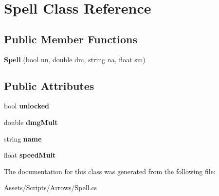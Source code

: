\hypertarget{class_spell}{}\section{Spell Class Reference}
\label{class_spell}
\subsection*{Public Member Functions}
\begin{DoxyCompactItemize}
\item 
\mbox{\label{class_spell_a69429a1783933ad446ee57e9a35b10de}} 
{\bfseries Spell} (bool un, double dm, string na, float sm)
\end{DoxyCompactItemize}
\subsection*{Public Attributes}
\begin{DoxyCompactItemize}
\item 
\mbox{\label{class_spell_aafd49e25b1309ecfc23b56e1aaabfd19}} 
bool {\bfseries unlocked}
\item 
\mbox{\label{class_spell_a79d53f2fffa4b3ad9e4adb166430a9fc}} 
double {\bfseries dmg\+Mult}
\item 
\mbox{\label{class_spell_ae6a6af372417cf9f204db6ea1cb18de6}} 
string {\bfseries name}
\item 
\mbox{\label{class_spell_ab0a70c8037e539a887c0447d5f5d72e2}} 
float {\bfseries speed\+Mult}
\end{DoxyCompactItemize}


The documentation for this class was generated from the following file\+:\begin{DoxyCompactItemize}
\item 
Assets/\+Scripts/\+Arrows/Spell.\+cs\end{DoxyCompactItemize}
